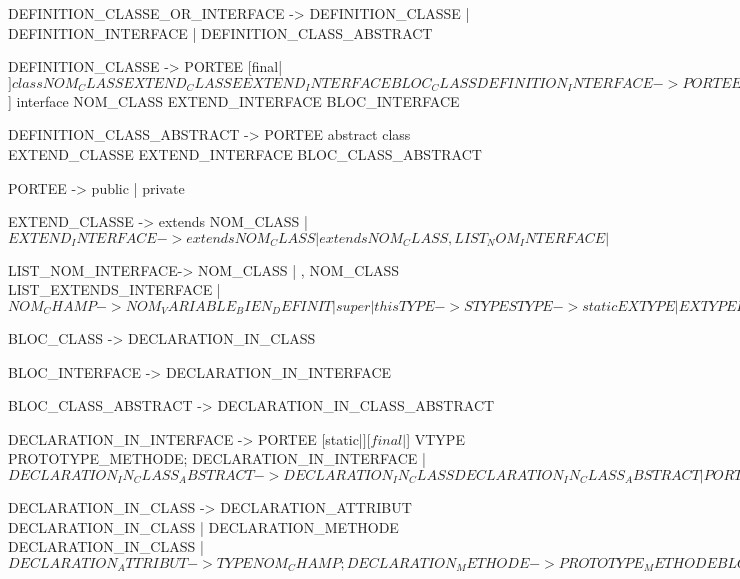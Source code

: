 DEFINITION_CLASSE_OR_INTERFACE -> DEFINITION_CLASSE 
								| DEFINITION_INTERFACE 
								| DEFINITION_CLASS_ABSTRACT

DEFINITION_CLASSE ->
	PORTEE [final|$] 
	class NOM_CLASS
	EXTEND_CLASSE EXTEND_INTERFACE
	BLOC_CLASS

DEFINITION_INTERFACE ->
	PORTEE [final|$] interface NOM_CLASS
	EXTEND_INTERFACE
	BLOC_INTERFACE

DEFINITION_CLASS_ABSTRACT ->
	PORTEE abstract class
	EXTEND_CLASSE EXTEND_INTERFACE
	BLOC_CLASS_ABSTRACT


PORTEE -> public | private

EXTEND_CLASSE -> extends NOM_CLASS 
			   | $

EXTEND_INTERFACE -> extends NOM_CLASS 
			      | extends NOM_CLASS , LIST_NOM_INTERFACE 
			      | $

LIST_NOM_INTERFACE-> NOM_CLASS 
				   | , NOM_CLASS LIST_EXTENDS_INTERFACE 
				   | $


NOM_CHAMP -> NOM_VARIABLE_BIEN_DEFINIT 
		   | super 
		   | this

TYPE -> STYPE
STYPE -> static EXTYPE 
	   | EXTYPE
EXTYPE -> final VTYPE 
		| abstract VTYPE 
		| VTYPE
VTYPE -> value CTYPE
	   | CTYPE

CTYPE -> NOM_TYPE 
	   | $

BLOC_CLASS -> { DECLARATION_IN_CLASS }

BLOC_INTERFACE -> {DECLARATION_IN_INTERFACE}

BLOC_CLASS_ABSTRACT -> {DECLARATION_IN_CLASS_ABSTRACT}

DECLARATION_IN_INTERFACE -> PORTEE [static|$] [final|$] VTYPE PROTOTYPE_METHODE; DECLARATION_IN_INTERFACE 
						  | $

DECLARATION_IN_CLASS_ABSTRACT ->
							DECLARATION_IN_CLASS DECLARATION_IN_CLASS_ABSTRACT
							| PORTEE abstract VTYPE PROTOTYPE_METHODE; DECLARATION_IN_CLASS_ABSTRACT
							| $


DECLARATION_IN_CLASS ->  DECLARATION_ATTRIBUT  DECLARATION_IN_CLASS 
			 | DECLARATION_METHODE DECLARATION_IN_CLASS
			 | $

DECLARATION_ATTRIBUT -> TYPE NOM_CHAMP;

DECLARATION_METHODE -> PROTOTYPE_METHODE { BLOC_METHODE }
					| PROTOTYPE_CONTRUCTEUR { BLOC_METHODE }

PROTOTYPE_METHODE -> PORTEE TYPE NOM_CHAMP (LIST_PARAM)
PROTOTYPE_CONTRUCTEUR -> PORTEE NOM_CLASS (LIST_PARAM)

PARAM -> VTYPE NOM_CHAMP
LIST_PARAM -> PARAM | PARAM, LIST_PARAM | $


